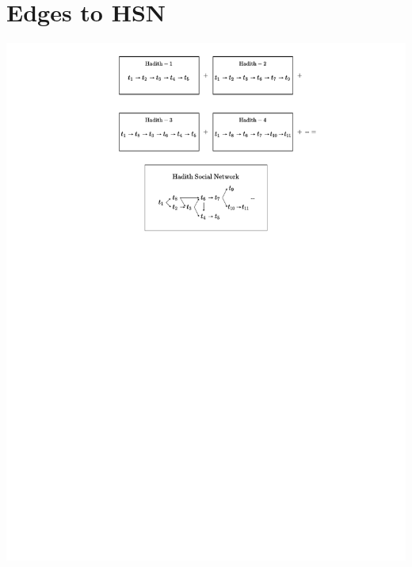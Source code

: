 \documentclass[12pt,english]{article}
\begin{document}
\section{Edges to HSN}
\vspace*{-0.4cm}
\hspace*{-2cm}
\includegraphics[scale=0.9]{edges-to-hsn/b1_edges_to_hsn.pdf}

\newpage
\end{document}
